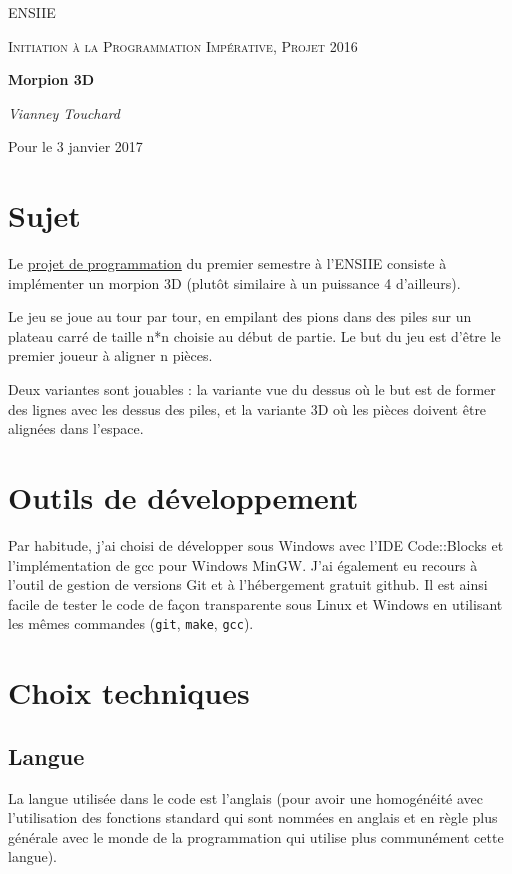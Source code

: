 \documentclass[a4paper, titlepage]{article}
\begin{document}
\begin{titlepage}
	\centering
	{\scshape\LARGE ENSIIE \par}
	\vspace{1cm}
	{\scshape\Large Initiation à la Programmation Impérative, Projet 2016\par}
	\vspace{1.5cm}
	{\huge\bfseries Morpion 3D\par}
	\vspace{2cm}
	{\Large\itshape Vianney Touchard\par}
	\vfill

	{\large Pour le 3 janvier 2017}
\end{titlepage}


\tableofcontents

\section{Sujet}
Le \href{http://www.ensiie.fr/~guillaume.burel/cours/IPI/projet_2016.html}{projet de programmation} du premier semestre à l'ENSIIE consiste à implémenter un morpion 3D (plutôt similaire à un puissance 4 d'ailleurs). 

Le jeu se joue au tour par tour, en empilant des pions dans des piles sur un plateau carré de taille n*n choisie au début de partie. Le but du jeu est d'être le premier joueur à aligner n pièces. 

Deux variantes sont jouables : la variante vue du dessus où le but est de former des lignes avec les dessus des piles, et la variante 3D où les pièces doivent être alignées dans l'espace.

\section{Outils de développement}
Par habitude, j'ai choisi de développer sous Windows avec l'IDE Code::Blocks et l'implémentation de gcc pour Windows MinGW. J'ai également eu recours à l'outil de gestion de versions Git et à l'hébergement gratuit github. Il est ainsi facile de tester le code de façon transparente sous Linux et Windows en utilisant les mêmes commandes (\texttt{git}, \texttt{make}, \texttt{gcc}).

\section{Choix techniques}
\subsection{Langue}
La langue utilisée dans le code est l'anglais (pour avoir une homogénéité avec l'utilisation des fonctions standard qui sont nommées en anglais et en règle plus générale avec le monde de la programmation qui utilise plus communément cette langue). 
\end{document}
